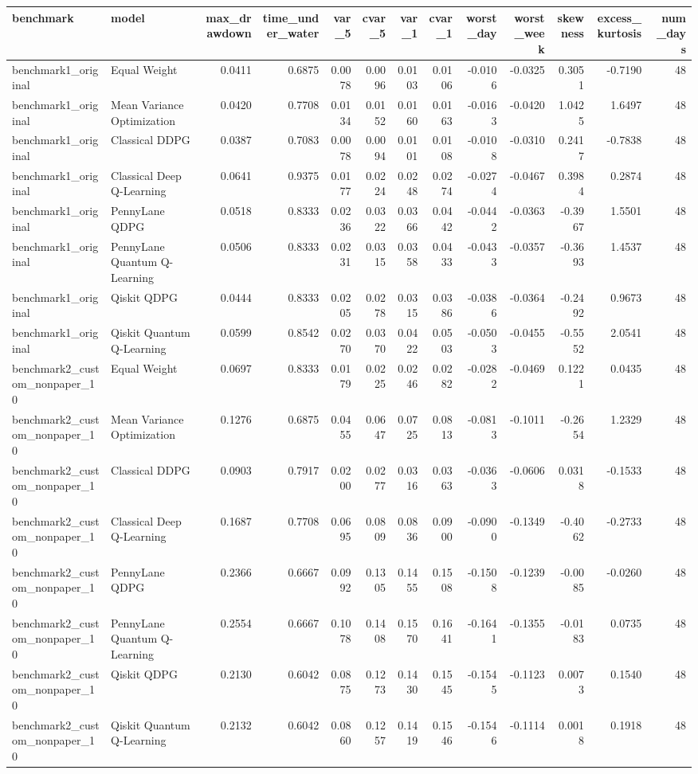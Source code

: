 \begin{tabular}{llrrrrrrrrrrr}
\toprule
benchmark & model & max_drawdown & time_under_water & var_5 & cvar_5 & var_1 & cvar_1 & worst_day & worst_week & skewness & excess_kurtosis & num_days \\
\midrule
benchmark1_original & Equal Weight & 0.0411 & 0.6875 & 0.0078 & 0.0096 & 0.0103 & 0.0106 & -0.0106 & -0.0325 & 0.3051 & -0.7190 & 48 \\
benchmark1_original & Mean Variance Optimization & 0.0420 & 0.7708 & 0.0134 & 0.0152 & 0.0160 & 0.0163 & -0.0163 & -0.0420 & 1.0425 & 1.6497 & 48 \\
benchmark1_original & Classical DDPG & 0.0387 & 0.7083 & 0.0078 & 0.0094 & 0.0101 & 0.0108 & -0.0108 & -0.0310 & 0.2417 & -0.7838 & 48 \\
benchmark1_original & Classical Deep Q-Learning & 0.0641 & 0.9375 & 0.0177 & 0.0224 & 0.0248 & 0.0274 & -0.0274 & -0.0467 & 0.3984 & 0.2874 & 48 \\
benchmark1_original & PennyLane QDPG & 0.0518 & 0.8333 & 0.0236 & 0.0322 & 0.0366 & 0.0442 & -0.0442 & -0.0363 & -0.3967 & 1.5501 & 48 \\
benchmark1_original & PennyLane Quantum Q-Learning & 0.0506 & 0.8333 & 0.0231 & 0.0315 & 0.0358 & 0.0433 & -0.0433 & -0.0357 & -0.3693 & 1.4537 & 48 \\
benchmark1_original & Qiskit QDPG & 0.0444 & 0.8333 & 0.0205 & 0.0278 & 0.0315 & 0.0386 & -0.0386 & -0.0364 & -0.2492 & 0.9673 & 48 \\
benchmark1_original & Qiskit Quantum Q-Learning & 0.0599 & 0.8542 & 0.0270 & 0.0370 & 0.0422 & 0.0503 & -0.0503 & -0.0455 & -0.5552 & 2.0541 & 48 \\
benchmark2_custom_nonpaper_10 & Equal Weight & 0.0697 & 0.8333 & 0.0179 & 0.0225 & 0.0246 & 0.0282 & -0.0282 & -0.0469 & 0.1221 & 0.0435 & 48 \\
benchmark2_custom_nonpaper_10 & Mean Variance Optimization & 0.1276 & 0.6875 & 0.0455 & 0.0647 & 0.0725 & 0.0813 & -0.0813 & -0.1011 & -0.2654 & 1.2329 & 48 \\
benchmark2_custom_nonpaper_10 & Classical DDPG & 0.0903 & 0.7917 & 0.0200 & 0.0277 & 0.0316 & 0.0363 & -0.0363 & -0.0606 & 0.0318 & -0.1533 & 48 \\
benchmark2_custom_nonpaper_10 & Classical Deep Q-Learning & 0.1687 & 0.7708 & 0.0695 & 0.0809 & 0.0836 & 0.0900 & -0.0900 & -0.1349 & -0.4062 & -0.2733 & 48 \\
benchmark2_custom_nonpaper_10 & PennyLane QDPG & 0.2366 & 0.6667 & 0.0992 & 0.1305 & 0.1455 & 0.1508 & -0.1508 & -0.1239 & -0.0085 & -0.0260 & 48 \\
benchmark2_custom_nonpaper_10 & PennyLane Quantum Q-Learning & 0.2554 & 0.6667 & 0.1078 & 0.1408 & 0.1570 & 0.1641 & -0.1641 & -0.1355 & -0.0183 & 0.0735 & 48 \\
benchmark2_custom_nonpaper_10 & Qiskit QDPG & 0.2130 & 0.6042 & 0.0875 & 0.1273 & 0.1430 & 0.1545 & -0.1545 & -0.1123 & 0.0073 & 0.1540 & 48 \\
benchmark2_custom_nonpaper_10 & Qiskit Quantum Q-Learning & 0.2132 & 0.6042 & 0.0860 & 0.1257 & 0.1419 & 0.1546 & -0.1546 & -0.1114 & 0.0018 & 0.1918 & 48 \\
\bottomrule
\end{tabular}
